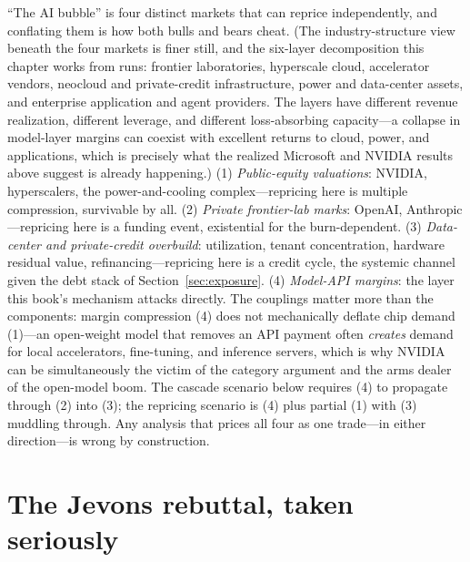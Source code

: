 ``The AI bubble'' is four distinct markets that can reprice independently, and conflating them is how both bulls and bears cheat. (The industry-structure view beneath the four markets is finer still, and the six-layer decomposition this chapter works from runs: frontier laboratories, hyperscale cloud, accelerator vendors, neocloud and private-credit infrastructure, power and data-center assets, and enterprise application and agent providers. The layers have different revenue realization, different leverage, and different loss-absorbing capacity---a collapse in model-layer margins can coexist with excellent returns to cloud, power, and applications, which is precisely what the realized Microsoft and NVIDIA results above suggest is already happening.) (1) \emph{Public-equity valuations}: NVIDIA, hyperscalers, the power-and-cooling complex---repricing here is multiple compression, survivable by all. (2) \emph{Private frontier-lab marks}: OpenAI, Anthropic---repricing here is a funding event, existential for the burn-dependent. (3) \emph{Data-center and private-credit overbuild}: utilization, tenant concentration, hardware residual value, refinancing---repricing here is a credit cycle, the systemic channel given the debt stack of Section~\ref{sec:exposure}. (4) \emph{Model-API margins}: the layer this book's mechanism attacks directly. The couplings matter more than the components: margin compression (4) does not mechanically deflate chip demand (1)---an open-weight model that removes an API payment often \emph{creates} demand for local accelerators, fine-tuning, and inference servers, which is why NVIDIA can be simultaneously the victim of the category argument and the arms dealer of the open-model boom. The cascade scenario below requires (4) to propagate through (2) into (3); the repricing scenario is (4) plus partial (1) with (3) muddling through. Any analysis that prices all four as one trade---in either direction---is wrong by construction.

\section{The Jevons rebuttal, taken seriously}
\label{sec:jevons}

